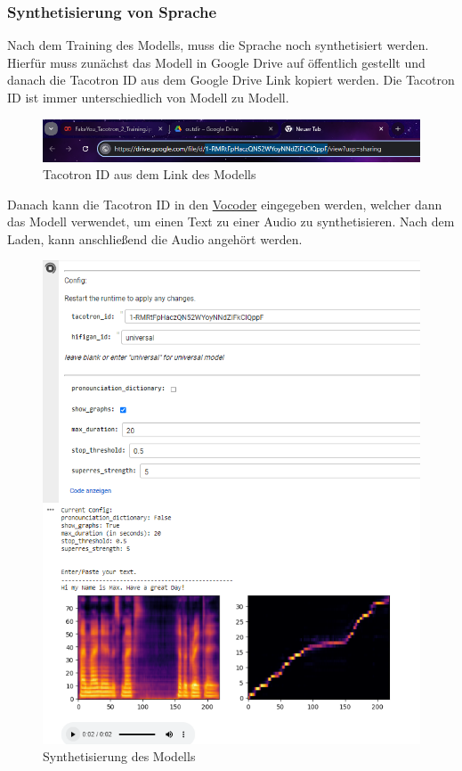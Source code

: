 \subsubsection*{Synthetisierung von Sprache}
Nach dem Training des Modells, muss die Sprache noch synthetisiert werden. Hierfür muss zunächst das Modell in Google Drive auf öffentlich gestellt und danach die Tacotron ID aus dem Google Drive Link kopiert werden. Die Tacotron ID ist immer unterschiedlich von Modell zu Modell.
\begin{figure}[H]
    \includegraphics[width=1.0\textwidth]{Bilder/AudioTrainingLink}
    \centering
    \caption{Tacotron ID aus dem Link des Modells}
    \label{fig:TrainingLink}
\end{figure}
Danach kann die Tacotron ID in den \href{https://colab.research.google.com/github/justinjohn0306/FakeYou-Tacotron2-Notebook/blob/main/FakeYou_Tacotron2_Hi_Fi_GAN_(CPU).ipynb#scrollTo=nU8YYg6PXgjg}{Vocoder} eingegeben werden, welcher dann das Modell verwendet, um einen Text zu einer Audio zu synthetisieren. Nach dem Laden, kann anschließend die Audio angehört werden.
\begin{figure}[H]
    \includegraphics[width=1.0\textwidth]{Bilder/AudioTrainingSynth}
    \centering
    \caption{Synthetisierung des Modells}
    \label{fig:TrainingSynth}
\end{figure}